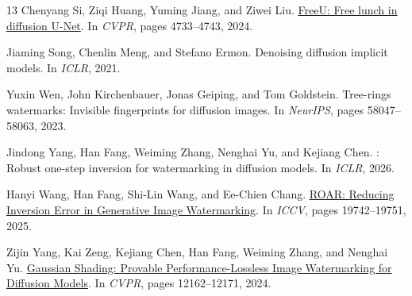 \documentclass[10pt,twocolumn,letterpaper]{article}
\begin{document}
{\begin{thebibliography}{13}
Chenyang Si, Ziqi Huang, Yuming Jiang, and Ziwei Liu.
\newblock \href{https://openaccess.thecvf.com/content/CVPR2024/html/Si_FreeU_Free_Lunch_in_Diffusion_U-Net_CVPR_2024_paper.html}{{FreeU}: Free lunch in diffusion {U-Net}}.
\newblock In \emph{CVPR}, pages 4733--4743, 2024.

Jiaming Song, Chenlin Meng, and Stefano Ermon.
\newblock Denoising diffusion implicit models.
\newblock In \emph{ICLR}, 2021.

Yuxin Wen, John Kirchenbauer, Jonas Geiping, and Tom Goldstein.
\newblock Tree-rings watermarks: Invisible fingerprints for diffusion images.
\newblock In \emph{NeurIPS}, pages 58047--58063, 2023.

Jindong Yang, Han Fang, Weiming Zhang, Nenghai Yu, and Kejiang Chen.
: Robust one-step inversion for watermarking in diffusion
  models.
\newblock In \emph{ICLR}, 2026.


Hanyi Wang, Han Fang, Shi-Lin Wang, and Ee-Chien Chang.
\newblock \href{https://openaccess.thecvf.com/content/ICCV2025/html/Wang_ROAR_Reducing_Inversion_Error_in_Generative_Image_Watermarking_ICCV_2025_paper.html}{ROAR: Reducing Inversion Error in Generative Image Watermarking}.
\newblock In \emph{ICCV}, pages 19742--19751, 2025.

Zijin Yang, Kai Zeng, Kejiang Chen, Han Fang, Weiming Zhang, and Nenghai Yu.
\newblock \href{https://openaccess.thecvf.com/content/CVPR2024/html/Yang_Gaussian_Shading_Provable_Performance-Lossless_Image_Watermarking_for_Diffusion_Models_CVPR_2024_paper.html}{Gaussian Shading: Provable Performance-Lossless Image Watermarking for Diffusion Models}.
\newblock In \emph{CVPR}, pages 12162--12171, 2024.

\end{thebibliography}

}
\end{document}
